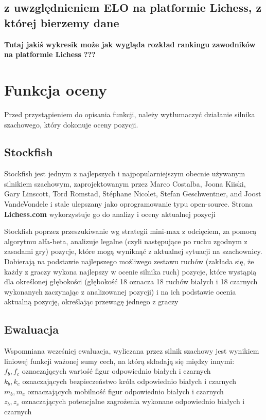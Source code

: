 \documentclass[inzynierska]{pwr_wmat_praca_dyplomowa}
\theoremstyle{plain}
\numberwithin{theorem}{chapter}
\theoremstyle{definition}
\numberwithin{theorem}{chapter}
\begin{document}
\subsection{z uwzględnieniem ELO na platformie Lichess, z której bierzemy dane}

\textbf{Tutaj jakiś wykresik może jak wygląda rozkład rankingu zawodników na platformie Lichess ???}
\section{Funkcja oceny}
Przed przystąpieniem do opisania funkcji, należy wytłumaczyć działanie silnika szachowego, który dokonuje oceny pozycji.
\subsection{Stockfish}
Stockfish jest jednym z najlepszych i najpopularniejszym obecnie używanym silnikiem szachowym, zaprojektowanym przez Marco Costalba, Joona Kiiski, Gary Linscott, Tord Romstad, Stéphane Nicolet, Stefan Geschwentner, and Joost VandeVondele i stale ulepszany jako oprogramowanie typu open-source. Strona \textbf{Lichess.com}\cite{stockfish_lichess} wykorzystuje go do analizy i oceny aktualnej pozycji

Stockfish poprzez przeszukiwanie wg strategii mini-max z odcięciem, za pomocą algorytmu alfa-beta, analizuje legalne (czyli następujące po ruchu zgodnym z zasadami gry) pozycje, które mogą wyniknąć z aktualnej sytuacji na szachownicy. Dobierają na podstawie najlepszego możliwego zestawu ruchów (zakłada się, że każdy z graczy wykona najlepszy w ocenie silnika ruch) pozycje, które wystąpią dla określonej głębokości (głębokość 18 oznacza 18 ruchów białych i 18 czarnych wykonanych zaczynając z analizowanej pozycji) i na ich podstawie ocenia aktualną pozycję, określając przewagę jednego z graczy

\subsection{Ewaluacja}
Wspomniana wcześniej ewaluacja, wyliczana przez silnik szachowy jest wynikiem liniowej funkcji 
ważonej sumy cech, na którą składają się między innymi:\\
$f_b,f_c$ oznaczających wartość figur odpowiednio białych i czarnych\\
$k_b,k_c$ oznaczających bezpieczeństwo króla odpowiednio białych i czarnych\\
$m_b,m_c$ oznaczających mobilność figur odpowiednio białych i czarnych\\
$z_b,z_c$ oznaczających potencjalne zagrożenia wykonane odpowiednio białych i czarnych\\
\end{document}
